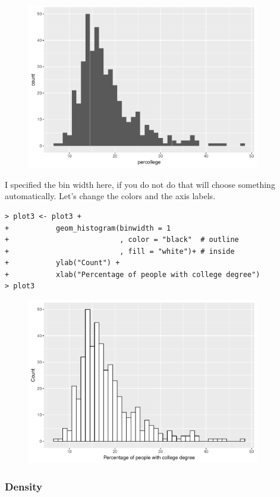 \begin{figure}[h]
\centering
\includegraphics[width=4in]{plots/09.pdf} 
\end{figure}

I specified the bin width here, if you do not do that \R will choose something automatically. Let's change the colors and the axis labels.

\begin{lstlisting}
> plot3 <- plot3 +
+           geom_histogram(binwidth = 1
+                          , color = "black"  # outline
+                          , fill = "white")+ # inside
+           ylab("Count") +
+           xlab("Percentage of people with college degree")
> plot3
\end{lstlisting}

\begin{figure}[h]
\centering
\includegraphics[width=4in]{plots/10.pdf} 
\end{figure}

\subsubsection*{Density}

